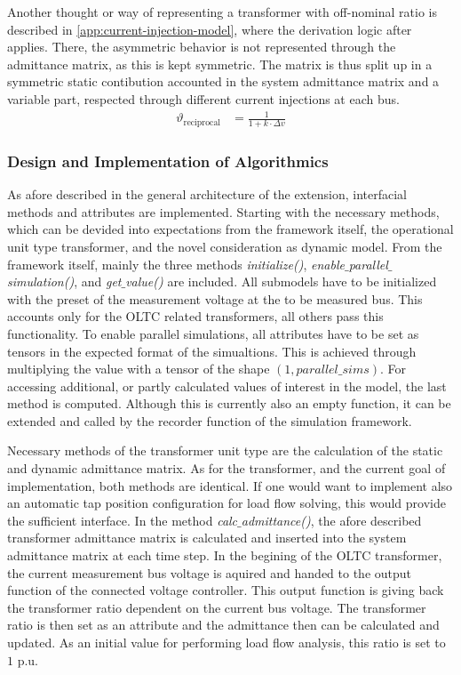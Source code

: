 Another thought or way of representing a transformer with off-nominal ratio is described in \autoref{app:current-injection-model}, where the derivation logic after \textcite{machowski_2020} applies.
There, the asymmetric behavior is not represented through the admittance matrix, as this is kept symmetric. 
The matrix is thus split up in a symmetric static contibution accounted in the system admittance matrix and a variable part, respected through different current injections at each bus. 
\begin{align}
        \vartheta_\mathrm{reciprocal} &= \frac{1}{1 + k \cdot \Delta v} \label{eq:tap-ratio-lv}
\end{align}

\subsubsection{Design and Implementation of Algorithmics}

As afore described in the general architecture of the extension, interfacial methods and attributes are implemented.
Starting with the necessary methods, which can be devided into expectations from the framework itself, the operational unit type transformer, and the novel consideration as dynamic model.
From the framework itself, mainly the three methods \textit{initialize()}, \textit{enable$\_$parallel$\_$simulation()}, and \textit{get$\_$value()} are included.
All submodels have to be initialized with the preset of the measurement voltage at the to be measured bus. 
This accounts only for the \acs{OLTC} related transformers, all others pass this functionality.
To enable parallel simulations, all attributes have to be set as tensors in the expected format of the simualtions.
This is achieved through multiplying the value with a tensor of the shape $(1, {parallel\_sims})$.
For accessing additional, or partly calculated values of interest in the model, the last method is computed.
Although this is currently also an empty function, it can be extended and called by the recorder function of the simulation framework.

Necessary methods of the transformer unit type are the calculation of the static and dynamic admittance matrix.
As for the transformer, and the current goal of implementation, both methods are identical.
If one would want to implement also an automatic tap position configuration for load flow solving, this would provide the sufficient interface.
In the method \textit{calc$\_$admittance()}, the afore described transformer admittance matrix is calculated and inserted into the system admittance matrix at each time step.
In the begining of the \acs{OLTC} transformer, the current measurement bus voltage is aquired and handed to the output function of the connected voltage controller.
This output function is giving back the transformer ratio dependent on the current bus voltage. 
The transformer ratio is then set as an attribute and the admittance then can be calculated and updated.
As an initial value for performing load flow analysis, this ratio is set to $1$ p.u.

